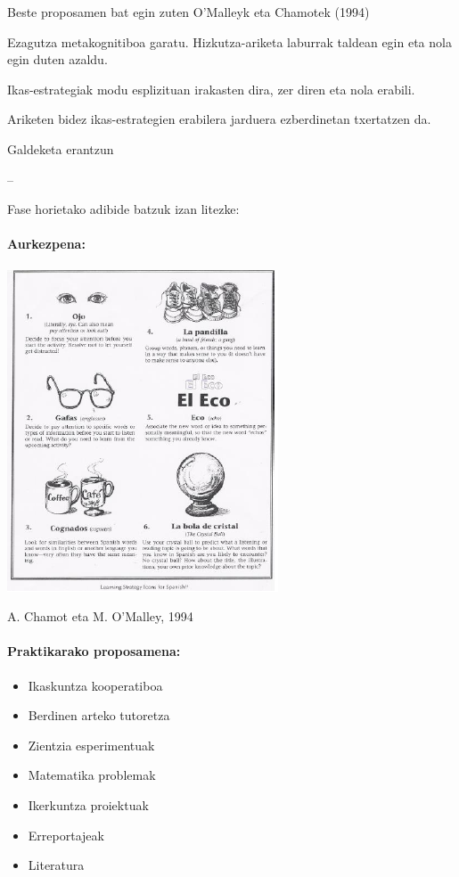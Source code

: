 \documentclass[
]{book}
\providecommand{\tightlist}{%
  \setlength{\itemsep}{0pt}\setlength{\parskip}{0pt}}
\begin{document}
Beste proposamen bat egin zuten O'Malleyk eta Chamotek (1994)

\begin{description}
\tightlist
\item[Prestakuntza fasea]
Ezagutza metakognitiboa garatu.
Hizkutza-ariketa laburrak taldean egin eta nola egin duten azaldu.
\item[Aurkezpena]
Ikas-estrategiak modu esplizituan irakasten dira, zer diren eta nola erabili.
\item[Praktika]
Ariketen bidez ikas-estrategien erabilera jarduera ezberdinetan txertatzen da.
\item[Ebaluazioa]
Galdeketa erantzun
\end{description}

--

Fase horietako adibide batzuk izan litezke:

\hypertarget{aurkezpena}{%
\paragraph{Aurkezpena:}\label{aurkezpena}}

\includegraphics{assets/06-04.png}

A. Chamot eta M. O'Malley, 1994

\hypertarget{praktikarako-proposamena}{%
\paragraph{Praktikarako proposamena:}\label{praktikarako-proposamena}}

\begin{itemize}
\tightlist
\item
  Ikaskuntza kooperatiboa
\item
  Berdinen arteko tutoretza
\item
  Zientzia esperimentuak
\item
  Matematika problemak
\item
  Ikerkuntza proiektuak
\item
  Erreportajeak
\item
  Literatura
\end{itemize}
\end{document}
